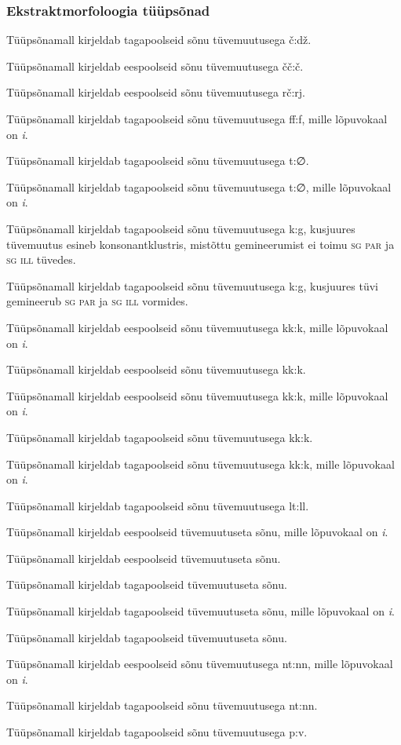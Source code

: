 \documentclass[12pt,a4paper]{article}
\newcommand{\msd}[1]{\textsc{#1}}
\begin{document}
\subsubsection*{Ekstraktmorfoloogia tüüpsõnad}
\vspace{-3.5em}

Tüüpsõna\-mall kirjeldab tagapoolseid sõnu tüvemuutusega č:dž.

Tüüpsõna\-mall kirjeldab eespoolseid sõnu tüvemuutusega čč:č.

Tüüpsõna\-mall kirjeldab eespoolseid sõnu tüvemuutusega rč:rj.

Tüüpsõna\-mall kirjeldab tagapoolseid sõnu tüvemuutusega ff:f, mille lõpuvokaal on \textit{i}. 

Tüüpsõna\-mall kirjeldab tagapoolseid sõnu tüvemuutusega t:∅.

Tüüpsõna\-mall kirjeldab tagapoolseid sõnu tüvemuutusega t:∅, mille lõpuvokaal on \textit{i}. 

Tüüpsõna\-mall kirjeldab tagapoolseid sõnu tüvemuutusega k:g, kusjuures tüvemuutus esineb konsonant\-klustris, mistõttu gemineerumist ei toimu \msd{sg par} ja \msd{sg ill} tüvedes.

Tüüpsõna\-mall kirjeldab tagapoolseid sõnu tüvemuutusega k:g, kusjuures tüvi gemineerub \msd{sg par} ja \msd{sg ill} vormides.

Tüüpsõna\-mall kirjeldab eespoolseid sõnu tüvemuutusega kk:k, mille lõpuvokaal on \textit{i}. 

Tüüpsõna\-mall kirjeldab eespoolseid sõnu tüvemuutusega kk:k.

Tüüpsõna\-mall kirjeldab eespoolseid sõnu tüvemuutusega kk:k, mille lõpuvokaal on \textit{i}. 

Tüüpsõna\-mall kirjeldab tagapoolseid sõnu tüvemuutusega kk:k.

Tüüpsõna\-mall kirjeldab tagapoolseid sõnu tüvemuutusega kk:k, mille lõpuvokaal on \textit{i}. 

Tüüpsõna\-mall kirjeldab tagapoolseid sõnu tüvemuutusega lt:ll.

Tüüpsõna\-mall kirjeldab eespoolseid tüvemuutuseta sõnu, mille lõpuvokaal on \textit{i}. 

Tüüpsõna\-mall kirjeldab eespoolseid tüvemuutuseta sõnu.

Tüüpsõna\-mall kirjeldab tagapoolseid tüvemuutuseta sõnu.

Tüüpsõna\-mall kirjeldab tagapoolseid tüvemuutuseta sõnu, mille lõpuvokaal on \textit{i}. 

Tüüpsõna\-mall kirjeldab tagapoolseid tüvemuutuseta sõnu.

Tüüpsõna\-mall kirjeldab eespoolseid sõnu tüvemuutusega nt:nn, mille lõpuvokaal on \textit{i}.

Tüüpsõna\-mall kirjeldab tagapoolseid sõnu tüvemuutusega nt:nn.

Tüüpsõna\-mall kirjeldab tagapoolseid sõnu tüvemuutusega p:v.
\end{document}

